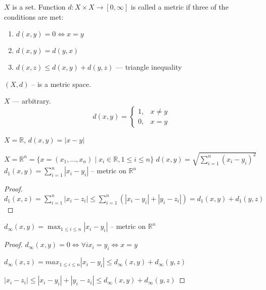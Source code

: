 
\begin{definition}
$X$ is a set. Function $d: X \times X \to [0, \infty]$ is called a metric if three of the conditions are met:
\begin{enumerate}
  \item $d(x, y) = 0 \iff x = y$
  \item $d(x, y) = d(y, x)$
  \item $d(x, z) \leq d(x, y) + d(y, z)$ --- triangle inequality
\end{enumerate}
\end{definition}

$(X, d)$ – is a metric space.

\begin{example}
   $X$ --- arbitrary.
   $$
d(x, y) = \begin{cases}
1, & x \neq y \\
0, & x = y
\end{cases}
$$
\end{example}

\begin{example}
   $X = \mathbb{R}$, $d(x,y) = |x - y|$
\end{example}

\begin{example}
$X = \mathbb{R}^n = \{ x = (x_{1}, \dots, x_{n}) \mid x_{i} \in \mathbb{R}, 1 \leq i \leq n \}$
   $d(x, y) = \sqrt{ \sum_{i=1}^{n} (x_{i} - y_{i})^{2} }$
   $d_{1}(x,y) = \sum_{i=1}^{n}|x_{i} - y_{i}|$ – metric on $\mathbb{R}^n$

   \begin{proof}
   $d_{1}(x,z) = \sum_{i=1}^n |x_{i} - z_{i}| \leq \sum_{i=1}^n(|x_{i} - y_{i}| + |y_{i} - z_{i}|) = d_{1}(x,y) + d_{1}(y, z)$
   \end{proof}
\end{example}

\begin{example}
   $d_{\infty}(x,y) = \max_{1 \leq i \leq n} |x_{i} - y_{i}|$ – metric on $\mathbb{R}^n$

   \begin{proof}
   $d_{\infty} (x,y) = 0 \iff \forall i x_{i} = y_{i} \iff x = y$

   $d_{\infty} (x, z) = max_{1\leq i \leq n} |x_{i} - y_{i}| \leq d_{\infty} (x,y) +d_{\infty}(y,z)$

   $|x_{i} - z_{i}| \leq |x_{i} - y_{i}| + |y_{i} - z_{i}| \leq d_{\infty}(x,y) + d_{\infty}(y,z)$
   \end{proof}
\end{example}

